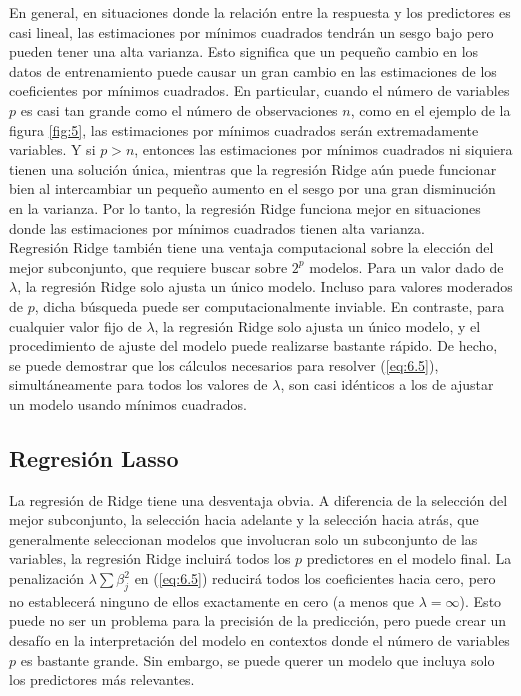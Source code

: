 En general, en situaciones donde la relación entre la respuesta y los predictores es casi lineal, las estimaciones por mínimos cuadrados tendrán un sesgo bajo pero pueden tener una alta varianza. Esto significa que un pequeño cambio en los datos de entrenamiento puede causar un gran cambio en las estimaciones de los coeficientes por mínimos cuadrados. En particular, cuando el número de variables $p$ es casi tan grande como el número de observaciones $n$, como en el ejemplo de la figura \ref{fig:5}, las estimaciones por mínimos cuadrados serán extremadamente variables. Y si $p > n$, entonces las estimaciones por mínimos cuadrados ni siquiera tienen una solución única, mientras que la regresión Ridge aún puede funcionar bien al intercambiar un pequeño aumento en el sesgo por una gran disminución en la varianza. Por lo tanto, la regresión Ridge funciona mejor en situaciones donde las estimaciones por mínimos cuadrados tienen alta varianza. \\

Regresión Ridge también tiene una ventaja computacional sobre la elección del mejor subconjunto, que requiere buscar sobre $2^p$ modelos. Para un valor dado de $\lambda$, la regresión Ridge solo ajusta un único modelo. Incluso para valores moderados de $p$, dicha búsqueda puede ser computacionalmente inviable. En contraste, para cualquier valor fijo de $\lambda$, la regresión Ridge solo ajusta un único modelo, y el procedimiento de ajuste del modelo puede realizarse bastante rápido. De hecho, se puede demostrar que los cálculos necesarios para resolver (\ref{eq:6.5}), simultáneamente para todos los valores de $\lambda$, son casi idénticos a los de ajustar un modelo usando mínimos cuadrados. 

\subsection{Regresión Lasso}

La regresión de Ridge tiene una desventaja obvia. A diferencia de la selección del mejor subconjunto, la selección hacia adelante y la selección hacia atrás, que generalmente seleccionan modelos que involucran solo un subconjunto de las variables, la regresión Ridge incluirá todos los $p$ predictores en el modelo final. La penalización $\lambda \sum \beta_j^2$ en (\ref{eq:6.5}) reducirá todos los coeficientes hacia cero, pero no establecerá ninguno de ellos exactamente en cero (a menos que $\lambda = \infty$). Esto puede no ser un problema para la precisión de la predicción, pero puede crear un desafío en la interpretación del modelo en contextos donde el número de variables $p$ es bastante grande. Sin embargo, se puede querer un modelo que incluya solo los predictores más relevantes. \\

